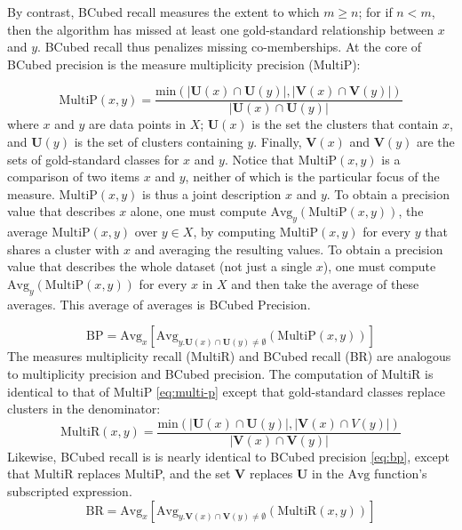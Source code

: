 {By contrast, BCubed recall measures the extent to which $m \geq n$; for if $n<m$, then the algorithm 
has missed at least one gold-standard relationship between $x$ and $y$. BCubed recall thus 
penalizes missing co-memberships.
At the core of BCubed precision is the measure multiplicity precision ($\text{MultiP}$):

\begin{equation}\label{eq:multi-p}
\text{MultiP}(x,y) = \frac{\text{min}(|\mathbf{U}(x) \cap \mathbf{U}(y)|, |\mathbf{V}(x) \cap \mathbf{V}(y)|)}{|\mathbf{U}(x) \cap \mathbf{U}(y)|}
\end{equation}
where $x$ and $y$ are data points in $X$; $\mathbf{U}(x)$ is the set the clusters that contain $x$, 
and $\mathbf{U}(y)$ is the set of clusters containing $y$.
Finally, 
$\mathbf{V}(x)$ and $\mathbf{V}(y)$ are the sets of gold-standard classes for $x$ and $y$. 
Notice that $\text{MultiP}(x,y)$ is a comparison of two items $x$ and $y$, neither of which is the 
particular focus of the measure. $\text{MultiP}(x,y)$ is thus a joint description $x$ and $y$. 
To obtain a precision value that describes $x$ alone, one must compute $\text{Avg}_{y}(\text{MultiP} (x,y))$, the 
average $\text{MultiP}(x,y)$ over $y \in X$, by computing $\text{MultiP}(x,y)$ for every $y$ that shares a cluster with $x$ 
and averaging the resulting values. To obtain a precision value that describes the whole dataset (not just a single $x$), 
one must compute $\text{Avg}_y(\text{MultiP}(x,y))$ for every $x$ in $X$ and then take the average of these averages. 
This average of averages is BCubed Precision. 

\begin{equation}\label{eq:bp}
\text{BP}=\text{Avg}_x [\text{Avg}_{y.\mathbf{U}(x) \cap \mathbf{U}(y) \neq \emptyset}(\text{MultiP}(x,y))]
\end{equation}
The measures multiplicity recall (MultiR) and BCubed recall (BR) are analogous to multiplicity precision and
 BCubed precision. The computation of MultiR is identical to that of MultiP \eqref{eq:multi-p}
 except that gold-standard classes replace clusters in the denominator: 
\begin{equation}\label{eq:multi-r}
\text{MultiR}(x,y) = \frac{\text{min}(|\mathbf{U}(x) \cap \mathbf{U}(y)|, |\mathbf{V}(x) \cap V (y)|)}{|\mathbf{V}(x) \cap \mathbf{V}(y)|}
\end{equation}
Likewise, BCubed recall is is nearly identical to BCubed precision \eqref{eq:bp}, except that MultiR replaces MultiP, 
and the set $\mathbf{V}$ replaces $\mathbf{U}$ in the $\text{Avg}$ function's subscripted expression.
\begin{equation}\label{eq:br}
\textrm{BR} = \textrm{Avg}_x [\textrm{Avg}_{y.\mathbf{V}(x) \cap \mathbf{V}(y) \neq \emptyset}(\text{MultiR}(x,y))]
\end{equation}

}
